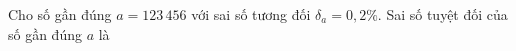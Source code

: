 \begin{ex}
Cho số gần đúng $a=123\,456$ với sai số tương đối $\delta_a=0{,}2\%$. Sai số tuyệt đối của số gần đúng $a$ là
\end{ex}
